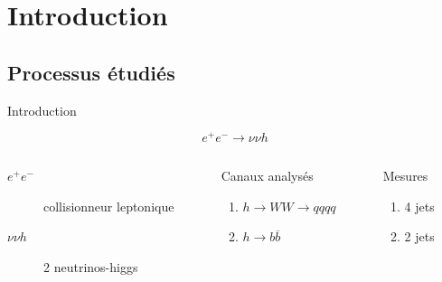 \documentclass[9pt]{beamer}
\newcommand{\bbar}{\overline{b}}
\begin{document}
\section{Introduction}
\subsection{Processus étudiés}
\begin{frame}{Introduction}

	$$ e^{+} e^{-} \longrightarrow \nu \nu h $$

	\begin{columns}
		
		\begin{column}{0.45\textwidth}
			\begin{description}
				\item[$e^{+} e^{-}$] collisionneur leptonique
				\item[$\nu \nu h$] 2 neutrinos-higgs
			\end{description}
		\end{column}
		
		\begin{column}{0.3\textwidth}
			\begin{block}{Canaux analysés}
				\begin{enumerate}
					\item $h \longrightarrow WW \longrightarrow qqqq$
					\item $h \longrightarrow b\bbar$
				\end{enumerate}
			\end{block}
        \end{column}
		
		\begin{column}{0.15\textwidth}
            \begin{block}{Mesures}
                \begin{enumerate}
                    \item 4 jets
                    \item 2 jets
                \end{enumerate}
            \end{block}
		\end{column}
	\end{columns}
    
\end{frame}
\end{document}
